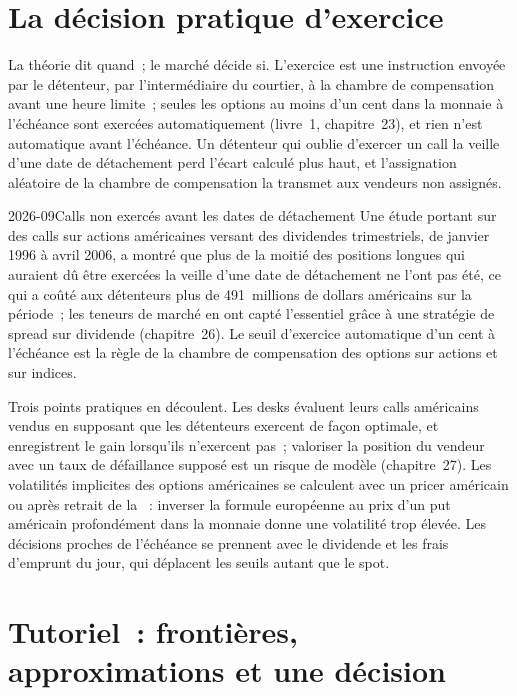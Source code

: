 \section{La décision pratique d'exercice}

La théorie dit quand~; le marché décide si. L'exercice est une instruction envoyée par le
détenteur, par l'intermédiaire du courtier, à la chambre de compensation avant une heure limite~; seules les options au moins
d'un cent dans la monnaie à l'échéance sont exercées automatiquement (livre~1, chapitre~23),
et rien n'est automatique avant l'échéance. Un détenteur qui oublie d'exercer un call la veille
d'une date de détachement perd l'écart calculé plus haut, et l'assignation
aléatoire de la chambre de compensation la transmet aux vendeurs non assignés.

\begin{dated}{2026-09}{Calls non exercés avant les dates de détachement}\label{dat:dv:american-options-and-early-exercise:pool}
Une étude portant sur des calls sur actions américaines versant des dividendes trimestriels, de janvier 1996 à
avril 2006, a montré que plus de la moitié des positions longues qui auraient dû être
exercées la veille d'une date de détachement ne l'ont pas été, ce qui a coûté aux détenteurs plus de
491~millions de dollars américains sur la période~; les teneurs de marché en ont capté l'essentiel
grâce à une stratégie de spread sur dividende (chapitre~26). Le seuil d'exercice automatique d'un cent
à l'échéance est la règle de la chambre de compensation des options sur actions et sur indices.
\end{dated}

Trois points pratiques en découlent. Les desks évaluent leurs calls américains vendus en supposant que
les détenteurs exercent de façon optimale, et enregistrent le gain lorsqu'ils n'exercent pas~; valoriser la
position du vendeur avec un taux de défaillance supposé est un risque de modèle (chapitre~27). Les volatilités
implicites des options américaines se calculent avec un pricer américain ou après retrait de la
~: inverser la formule européenne au prix d'un put américain profondément dans
la monnaie donne une volatilité trop élevée. Les décisions proches de l'échéance se prennent avec
le dividende et les frais d'emprunt du jour, qui déplacent les seuils autant que le spot.

\section{Tutoriel~: frontières, approximations et une décision}\label{tut:dv:american-options-and-early-exercise:tut}

